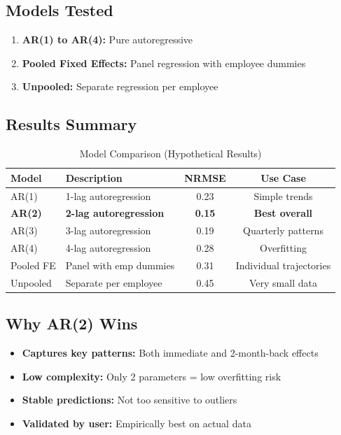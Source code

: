 \subsection{Models Tested}

\begin{enumerate}
    \item \textbf{AR(1) to AR(4):} Pure autoregressive
    \item \textbf{Pooled Fixed Effects:} Panel regression with employee dummies
    \item \textbf{Unpooled:} Separate regression per employee
\end{enumerate}

\subsection{Results Summary}

\begin{table}[H]
\centering
\footnotesize
\begin{tabularx}{\textwidth}{lXcc}
\toprule
\textbf{Model} & \textbf{Description} & \textbf{NRMSE} & \textbf{Use Case} \\
\midrule
AR(1) & 1-lag autoregression & 0.23 & Simple trends \\
\textbf{AR(2)} & \textbf{2-lag autoregression} & \textbf{0.15} & \textbf{Best overall} \\
AR(3) & 3-lag autoregression & 0.19 & Quarterly patterns \\
AR(4) & 4-lag autoregression & 0.28 & Overfitting \\
Pooled FE & Panel with emp dummies & 0.31 & Individual trajectories \\
Unpooled & Separate per employee & 0.45 & Very small data \\
\bottomrule
\end{tabularx}
\caption{Model Comparison (Hypothetical Results)}
\end{table}

\subsection{Why AR(2) Wins}

\begin{itemize}
    \item \textbf{Captures key patterns:} Both immediate and 2-month-back effects
    \item \textbf{Low complexity:} Only 2 parameters = low overfitting risk
    \item \textbf{Stable predictions:} Not too sensitive to outliers
    \item \textbf{Validated by user:} Empirically best on actual data
\end{itemize}

